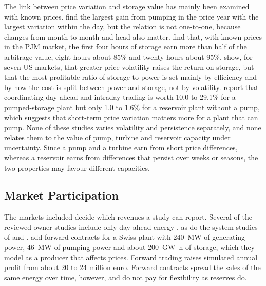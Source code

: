The link between price variation and storage value has mainly been
examined with known prices. \citet{ak2019quantifying} find the largest
gain from pumping in the price year with the largest variation within
the day, but the relation is not one-to-one, because changes from month
to month and head also matter. \citet{sioshansi2009estimating} find
that, with known prices in the PJM market, the first four hours of
storage earn more than half of the arbitrage value, eight hours about
85\% and twenty hours about 95\%. \citet{bradbury2014economic} show,
for seven US markets, that greater price volatility raises the return on
storage, but that the most profitable ratio of storage to power is set
mainly by efficiency and by how the cost is split between power and
storage, not by volatility. \citet{lohndorf2023} report that
coordinating day-ahead and intraday trading is worth 10.0 to 29.1\% for
a pumped-storage plant but only 1.0 to 1.6\% for a reservoir plant
without a pump, which suggests that short-term price variation matters
more for a plant that can pump. None of these studies varies volatility
and persistence separately, and none relates them to the value of pump,
turbine and reservoir capacity under uncertainty. Since a pump and a
turbine earn from short price differences, whereas a reservoir earns
from differences that persist over weeks or seasons, the two properties
may favour different capacities.

\subsection{Market Participation}
\label{sec:lit_markets}

The markets included decide which revenues a study can report. Several
of the reviewed owner studies include only day-ahead energy
\citep{ak2019quantifying,alic2023optimal,schuller2024practical}, as do
the system studies of \citet{henden2016economic} and \citet{helseth2017}.
\citet{abgottspon2013stochastic} add forward contracts for a Swiss plant
with \SI{240}{\mega\watt} of generating power, \SI{46}{\mega\watt} of
pumping power and about \SI{200}{\giga\watt\hour} of storage, which they
model as a producer that affects prices. Forward trading raises
simulated annual profit from about 20 to 24 million euro. Forward
contracts spread the sales of the same energy over time, however, and
do not pay for flexibility as reserves do.

